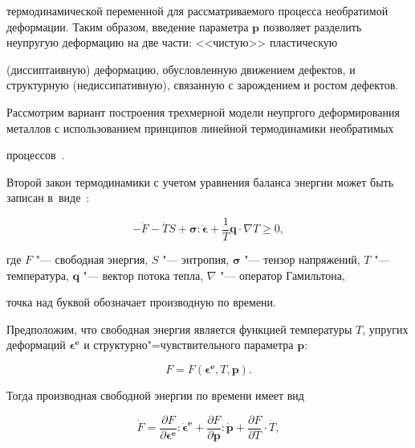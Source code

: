 термодинамической переменной для рассматриваемого процесса необратимой деформации. Таким образом, введение параметра $\boldsymbol{p}$  позволяет разделить неупругую деформацию на две части: <<чистую>> пластическую

(диссиптаивную) деформацию, обусловленную движением дефектов, и структурную (недиссипативную), связанную с зарождением и ростом дефектов.



\smallskip




Рассмотрим вариант построения трехмерной модели неупргого деформирования металлов с использованием принципов линейной термодинамики необратимых

процессов~\cite{kostina:bib:GlensdPrig}.



Второй закон термодинамики с учетом уравнения баланса энергии может быть записан в~виде~\cite{kostina:bib:RosakisRaviHodow}:

\begin{equation}

-\dot{F}-\dot{T}S+\boldsymbol{\sigma}:\boldsymbol{\dot{\epsilon}}+\frac{1}{T}\boldsymbol{q}\cdot\nabla{T}\geq0, \label{eq:kov:SecondLaw}

\end{equation}

где $F$ "--- свободная энергия, $S$ "---  энтропия, $\boldsymbol{\sigma}$ "--- тензор напряжений,  $T$ "---  температура, $\boldsymbol{q}$ "--- вектор потока тепла,  $\nabla$ "---  оператор Гамильтона,

точка над буквой обозначает производную по времени.



Предположим, что свободная энергия является функцией температуры  $T$, упругих деформаций $\boldsymbol{\epsilon^{e}}$  и структурно"=чувствительного параметра $\boldsymbol{p}$:

$$

F=F(\boldsymbol{\epsilon^{e}}, T, \boldsymbol{p}).

$$

Тогда производная свободной энергии по времени имеет вид

\begin{equation}

\dot{F}=\frac{\partial F}{\partial{\boldsymbol{\epsilon^{e}}}}:\boldsymbol{\dot{\epsilon}^{e}}+\frac{\partial F}{\partial{\boldsymbol{p}}}:\dot{\boldsymbol{p}}+\frac{\partial F}{\partial T}\cdot\dot{T}, \label{eq:kov:FreeDot}

\end{equation}

